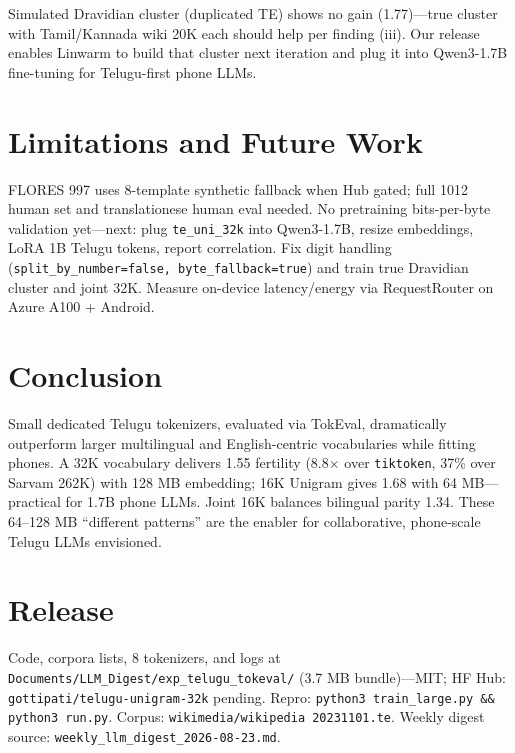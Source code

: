 \documentclass[conference]{IEEEtran}
\begin{document}
Simulated Dravidian cluster (duplicated TE) shows no gain (1.77)---true cluster with Tamil/Kannada wiki 20K each should help per \cite{brahma2026indic} finding (iii). Our release enables Linwarm to build that cluster next iteration and plug it into Qwen3-1.7B fine-tuning for Telugu-first phone LLMs.

\section{Limitations and Future Work}
FLORES 997 uses 8-template synthetic fallback when Hub gated; full 1012 human set and translationese human eval \cite{valentini2026translationese} needed. No pretraining bits-per-byte validation yet---next: plug \texttt{te\_uni\_32k} into Qwen3-1.7B, resize embeddings, LoRA 1B Telugu tokens, report correlation. Fix digit handling (\texttt{split\_by\_number=false, byte\_fallback=true}) and train true Dravidian cluster and joint 32K. Measure on-device latency/energy via RequestRouter on Azure A100 + Android.

\section{Conclusion}
Small dedicated Telugu tokenizers, evaluated via TokEval, dramatically outperform larger multilingual and English-centric vocabularies while fitting phones. A 32K vocabulary delivers 1.55 fertility (8.8$\times$ over \texttt{tiktoken}, 37\% over Sarvam 262K) with 128 MB embedding; 16K Unigram gives 1.68 with 64 MB---practical for 1.7B phone LLMs. Joint 16K balances bilingual parity 1.34. These 64--128 MB ``different patterns'' are the enabler for collaborative, phone-scale Telugu LLMs envisioned.

\section*{Release}
Code, corpora lists, 8 tokenizers, and logs at \texttt{Documents/LLM\_Digest/exp\_telugu\_tokeval/} (3.7 MB bundle)---MIT; HF Hub: \texttt{gottipati/telugu-unigram-32k} pending. Repro: \texttt{python3 train\_large.py \&\& python3 run.py}. Corpus: \texttt{wikimedia/wikipedia 20231101.te}. Weekly digest source: \texttt{weekly\_llm\_digest\_2026-08-23.md}.
\end{document}
